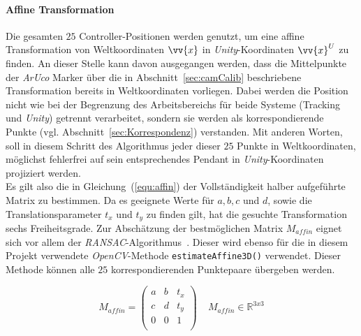 \paragraph{Affine Transformation} Die gesamten $25$ Controller-Positionen werden genutzt, um eine affine Transformation von Weltkoordinaten $\vv{x}$ in \emph{Unity}-Koordinaten $\vv{x}^U$ zu finden. An dieser Stelle kann davon ausgegangen werden, dass die Mittelpunkte der \textit{ArUco} Marker über die in Abschnitt~\ref{sec:camCalib} beschriebene Transformation bereits in Weltkoordinaten vorliegen. Dabei werden die Position nicht wie bei der Begrenzung des Arbeitsbereichs für beide Systeme (Tracking und \textit{Unity}) getrennt verarbeitet, sondern sie werden als korrespondierende Punkte (vgl. Abschnitt~\ref{sec:Korrespondenz}) verstanden. Mit anderen Worten, soll in diesem Schritt des Algorithmus jeder dieser $25$ Punkte in Weltkoordinaten, möglichst fehlerfrei auf sein entsprechendes Pendant in \emph{Unity}-Koordinaten projiziert werden. \\
Es gilt also die in Gleichung~(\ref{equ:affin}) der Vollständigkeit halber aufgeführte Matrix zu bestimmen. Da es geeignete Werte für $a, b, c$ und $d$, sowie die Translationsparameter $t_x$ und $t_y$ zu finden gilt, hat die gesuchte Transformation sechs Freiheitsgrade. Zur Abschätzung der bestmöglichen Matrix $M_{affin}$ eignet sich vor allem der \textit{RANSAC}-Algorithmus~\cite{articel:RANSAC}. Dieser wird ebenso für die in diesem Projekt verwendete \textit{OpenCV}-Methode \texttt{estimate\-Affine3D()} verwendet. Dieser Methode können alle $25$ korrespondierenden Punktepaare übergeben werden. 

\begin{equation}
\label{equ:affin}
M_{affin} = 
\begin{pmatrix}
a & b & t_x \\
c & d & t_y \\
0 & 0 & 1  \\
\end{pmatrix} 
~ ~ ~ ~ ~M_{affin} \in \mathbb{R}^{3x3}
\end{equation}

